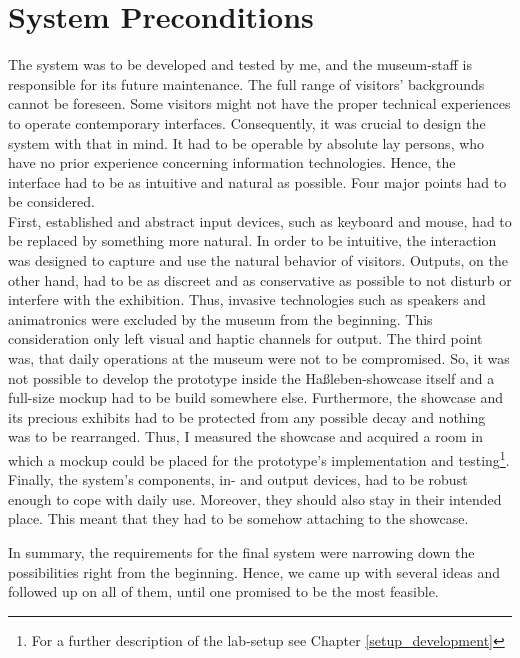 
\section{System Preconditions}
\label{conception_system}

The system was to be developed and tested by me, and the museum-staff is responsible for its future maintenance. The full range of visitors' backgrounds cannot be foreseen. Some visitors might not have the proper technical experiences to operate contemporary interfaces. Consequently, it was crucial to design the system with that in mind. It had to be operable by absolute lay persons, who have no prior experience concerning information technologies. Hence, the interface had to be as intuitive and natural as possible. Four major points had to be considered.
\\
First, established and abstract input devices, such as keyboard and mouse, had to be replaced by something more natural. In order to be intuitive, the interaction was designed to capture and use the natural behavior of visitors. Outputs, on the other hand, had to be as discreet and as conservative as possible to not disturb or interfere with the exhibition. Thus, invasive technologies such as speakers and animatronics were excluded by the museum from the beginning. This consideration only left visual and haptic channels for output. The third point was, that daily operations at the museum were not to be compromised. So, it was not possible to develop the prototype inside the Haßleben-showcase itself and a full-size mockup had to be build somewhere else. Furthermore, the showcase and its precious exhibits had to be protected from any possible decay and nothing was to be rearranged. Thus, I measured the showcase and acquired a room in which a mockup could be placed for the prototype's implementation and testing\footnote{For a further description of the lab-setup see Chapter \ref{setup_development}}. Finally, the system's components, in- and output devices, had to be robust enough to cope with daily use. Moreover, they should also stay in their intended place. This meant that they had to be somehow attaching to the showcase.

In summary, the requirements for the final system were narrowing down the possibilities right from the beginning. Hence, we came up with several ideas and followed up on all of them, until one promised to be the most feasible.


